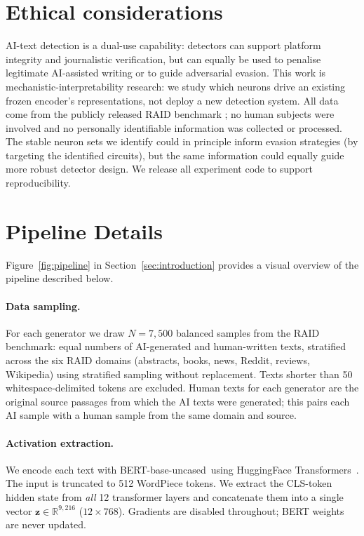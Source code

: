 \documentclass[11pt]{article}
\newcommand{\bertbase}{BERT-base-uncased\xspace}
\begin{document}
\section*{Ethical considerations}
\label{sec:ethics}

AI-text detection is a dual-use capability: detectors can support platform integrity and journalistic verification, but can equally be used to penalise legitimate AI-assisted writing or to guide adversarial evasion. This work is mechanistic-interpretability research: we study which neurons drive an existing frozen encoder's representations, not deploy a new detection system. All data come from the publicly released RAID benchmark \citep{dugan2024raid}; no human subjects were involved and no personally identifiable information was collected or processed. The stable neuron sets we identify could in principle inform evasion strategies (by targeting the identified circuits), but the same information could equally guide more robust detector design. We release all experiment code to support reproducibility.



\appendix

\section{Pipeline Details}
\label{app:pipeline}

Figure~\ref{fig:pipeline} in Section~\ref{sec:introduction} provides a visual overview of the pipeline described below.

\paragraph{Data sampling.}
For each generator we draw $N = 7{,}500$ balanced samples from the RAID benchmark: equal numbers of AI-generated and human-written texts, stratified across the six RAID domains (abstracts, books, news, Reddit, reviews, Wikipedia) using stratified sampling without replacement. Texts shorter than 50 whitespace-delimited tokens are excluded. Human texts for each generator are the original source passages from which the AI texts were generated; this pairs each AI sample with a human sample from the same domain and source.

\paragraph{Activation extraction.}
We encode each text with \bertbase\ using HuggingFace Transformers~\citep{wolf2020transformers}. The input is truncated to 512 WordPiece tokens. We extract the CLS-token hidden state from \emph{all} 12 transformer layers and concatenate them into a single vector $\mathbf{z} \in \mathbb{R}^{9{,}216}$ ($12 \times 768$). Gradients are disabled throughout; BERT weights are never updated.
\end{document}
